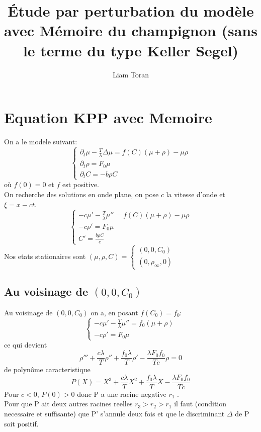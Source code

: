 \documentclass[12pt]{extarticle}
\title{Étude par perturbation du modèle avec Mémoire du champignon (sans le terme du type Keller Segel)}
\author{Liam Toran}
\newcommand{\dt}{\partial_t}
\newcommand{\Tl}{\frac{T}{\lambda}}
\begin{document}
\maketitle

\section{Equation KPP avec Memoire}
On a le modele suivant: 
\begin{equation} \left\{
                \begin{array}{ll}
                   \dt\mu -\frac{T}{\lambda}\Delta\mu = f(C)(\mu + \rho) -\mu\rho\\
                 \dt\rho=  F_0 \mu \\
                  \dt C = -b\rho C
                \end{array}
              \right.
\end{equation} 
où $f(0)=0$ et $f$ est positive.\\
On recherche des solutions en onde plane, on pose $c$ la vitesse d'onde et $\xi = x - ct$. \\
\begin{equation} \left\{ \begin{array}{ll} -c \mu'-\Tl\mu''=f(C)(\mu+\rho)-\mu\rho \\ -c\rho' = F_0\mu  \\C'=\frac{b\rho C}{c} \end{array}\right.
\end{equation}
Nos etats stationaires sont $(\mu,\rho,C) = \left\{ \begin{array}{ll} (0,0,C_0) \\
 (0,\rho_\infty,0) \end{array} \right.$ 
\subsection{Au voisinage de $(0,0,C_0)$}
Au voisinage de $(0,0,C_0)$ on a, en posant $f(C_0)=f_0$:
\begin{equation} \left\{ \begin{array}{ll} -c \mu'-\Tl\mu''=f_0(\mu+\rho) \\ -c\rho' = F_0\mu   \end{array}\right.
\end{equation} ce qui devient  \begin{equation} \rho''' +\frac{c\lambda}{T}\rho''+\frac{f_0\lambda}{T}\rho'-\frac{\lambda F_0f_0}{Tc}\rho =0 \end{equation} de polynôme caracteristique \begin{equation} P(X)= X^3 +\frac{c\lambda}{T}X^2+\frac{f_0\lambda}{T}X-\frac{\lambda F_0f_0}{Tc} \end{equation}
Pour $c<0$,   $P(0)>0$ donc P a une racine negative $r_1$ .\\
Pour que P ait deux autres racines reelles $r_3>r_2>r_1$ il faut (condition necessaire et suffisante) que P' s'annule deux fois et que le discriminant $\Delta$ de P soit positif.
\end{document}

